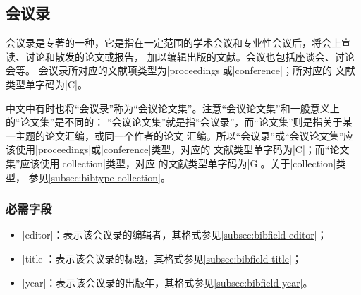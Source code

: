 
\subsection{会议录}\label{subsec:bibtype-conference}

会议录是专著的一种，它是指在一定范围的学术会议和专业性会议后，将会上宣读、讨论和散发的论文或报告，
加以编辑出版的文献\cite{hudong2013huiyilu}。会议也包括座谈会、讨论会等\cite{gbt7714-2005}。
会议录所对应的{\BibTeX}文献项类型为|proceedings|或|conference|；所对应的
文献类型单字码为|C|\cite{gbt7714-2005}。

\begin{note}
中文中有时也将“会议录”称为“会议论文集”。注意“会议论文集”和一般意义上的“论文集”是不同的：
“会议论文集”就是指“会议录”，而“论文集”则是指关于某一主题的论文汇编，或同一个作者的论文
汇编。所以“会议录”或“会议论文集”应该使用|proceedings|或|conference|类型，对应的
文献类型单字码为|C|；而“论文集”应该使用|collection|类型，对应
的文献类型单字码为|G|。关于|collection|类型，
参见\ref{subsec:bibtype-collection}。
\end{note}

\subsubsection{必需字段}

\begin{itemize}
\item |editor|：表示该会议录的编辑者，其格式参见\ref{subsec:bibfield-editor}；
\item |title|：表示该会议录的标题，其格式参见\ref{subsec:bibfield-title}；
\item |year|：表示该会议录的出版年，其格式参见\ref{subsec:bibfield-year}。
\end{itemize}

